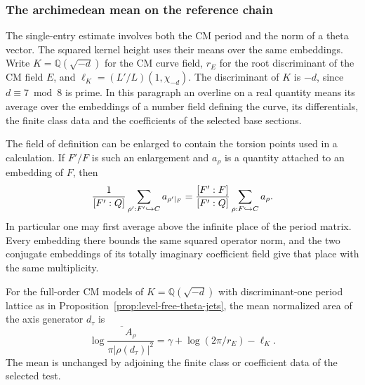 \subsubsection{The archimedean mean on the reference chain}
\label{subsec:selected-period-means}

The single-entry estimate involves both the CM period and the norm of a theta vector. The squared kernel height uses their means over the same embeddings. Write \(K=\mathbb Q(\sqrt{-d})\) for the CM curve field,
\(r_E\) for the root discriminant of the CM field \(E\), and
\(\ell_K=(L'/L)(1,\chi_{-d})\). The discriminant of \(K\) is
\(-d\), since \(d\equiv7\bmod8\) is prime. In this paragraph an
overline on a real quantity means its average over the embeddings
of a number field defining the curve, its differentials, the
finite class data and the coefficients of the selected base
sections.

The field of definition can be enlarged to contain the torsion points used
in a calculation. If \(F'/F\) is such an enlargement and \(a_\rho\) is a quantity
attached to an embedding of \(F\), then
\[
 \frac{1}{[F':Q]}\sum_{\rho':F'\hookrightarrow C}a_{\rho'|_F}
    =\frac{[F':F]}{[F':Q]}\sum_{\rho:F\hookrightarrow C}a_\rho .
\] In particular one may first average
above the infinite place of the period matrix. Every embedding
there bounds the same squared operator norm, and the two
conjugate embeddings of its totally imaginary coefficient field
give that place with the same multiplicity.

\begin{proposition}\label{prop:mean-differential-area}
For the full-order CM models of \(K=\mathbb Q(\sqrt{-d})\)
with discriminant-one period lattice as in
Proposition~\ref{prop:level-free-theta-jets}, the mean normalized
area of the axis
generator \(d_\tau\) is
\[
 \overline{\log\frac{A_\rho}{\pi|\rho(d_\tau)|^2}}
   =\gamma+\log(2\pi/r_E)-\ell_K .
\]
The mean is unchanged by adjoining the finite class or
coefficient data of the selected test.
\end{proposition}

